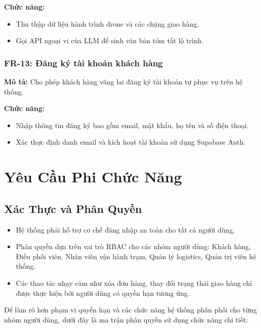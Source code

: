 \textbf{Chức năng:}
\begin{itemize}
  \item Thu thập dữ liệu hành trình drone và các chặng giao hàng.
  \item Gọi API ngoại vi của LLM để sinh văn bản tóm tắt lộ trình.
\end{itemize}

\subsubsection{FR-13: Đăng ký tài khoản khách hàng}
\textbf{Mô tả:} Cho phép khách hàng vãng lai đăng ký tài khoản tự phục vụ trên hệ thống.

\textbf{Chức năng:}
\begin{itemize}
  \item Nhập thông tin đăng ký bao gồm email, mật khẩu, họ tên và số điện thoại.
  \item Xác thực định danh email và kích hoạt tài khoản sử dụng Supabase Auth.
\end{itemize}

\section{Yêu Cầu Phi Chức Năng}

\subsection{Xác Thực và Phân Quyền}
\begin{itemize}
  \item Hệ thống phải hỗ trợ cơ chế đăng nhập an toàn cho tất cả người dùng.
  \item Phân quyền dựa trên vai trò RBAC cho các nhóm người dùng: Khách hàng, Điều phối viên, Nhân viên vận hành trạm, Quản lý logistics, Quản trị viên hệ thống.
  \item Các thao tác nhạy cảm như xóa đơn hàng, thay đổi trạng thái giao hàng chỉ được thực hiện bởi người dùng có quyền hạn tương ứng.
\end{itemize}

Để làm rõ hơn phạm vi quyền hạn và các chức năng hệ thống phân phối cho từng nhóm người dùng, dưới đây là ma trận phân quyền sử dụng chức năng chi tiết:

